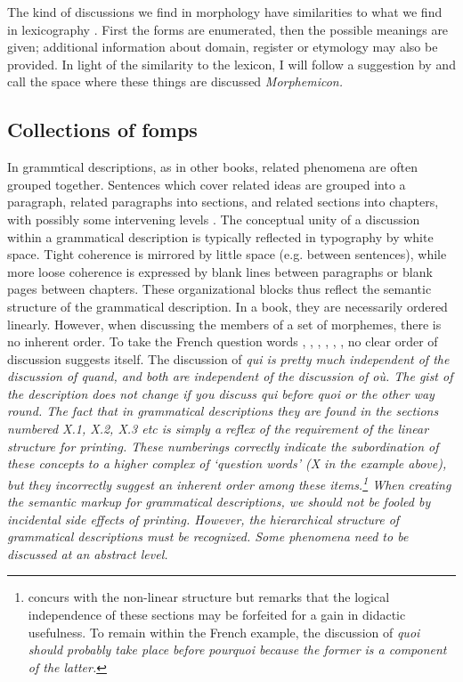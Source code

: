 \documentclass[a4paper,12pt]{article}
\begin{document}
The kind of discussions we find in morphology have similarities to what we find in lexicography \citep{SchultzeBerndt1998,Mosel2006craft,Weber2006grow}. First the forms are enumerated, then the possible meanings are given; additional information about domain, register or etymology may also be provided. In light of the similarity to the lexicon, I will follow a suggestion by \citet{LehmannEtAl2004} and call the space where these things are discussed \em Morphemicon\em.

\subsection{Collections of fomps}
In grammtical descriptions, as in other books, related phenomena are often grouped together. Sentences which cover related ideas are grouped into a paragraph, related paragraphs into sections, and related sections into chapters, with possibly some intervening levels \citep{Good2004}. The conceptual unity of a discussion within a grammatical description is typically reflected in typography by white space. Tight coherence is mirrored by little space (e.g. between sentences), while more loose coherence is expressed by blank lines between paragraphs or blank pages between chapters. These organizational blocks thus reflect the semantic structure of the grammatical description. In a book, they are necessarily ordered linearly. However, when discussing the members of a set of morphemes, there is no inherent order. To take the French question words
,
,
,
,
,
, no clear order of discussion suggests itself. The discussion of \em qui \em is pretty much independent of the discussion of \em quand\em, and both are independent of the discussion of \em où\em. The gist of the description does not change if you discuss \em qui \em before \em quoi \em or the other way round. The fact that in grammatical descriptions they are found in the sections numbered X.1, X.2, X.3 etc is simply a reflex of the requirement of the linear structure for printing. These numberings correctly indicate the subordination of these concepts to a higher complex of `question words' (X in the example above), but they incorrectly suggest an inherent  order among these items.\footnote{\citet{Good2004} concurs with the non-linear structure but remarks that the logical independence of these sections may be forfeited for a gain in didactic usefulness. To remain within the French example, the discussion of \em quoi \em should probably take place before \em pourquoi \em because the former is a component of the latter.} When creating the semantic markup for grammatical descriptions, we should not be fooled by incidental side effects of printing. However, the hierarchical structure of grammatical descriptions must be recognized. Some phenomena need to be discussed at an abstract level.
\end{document}

